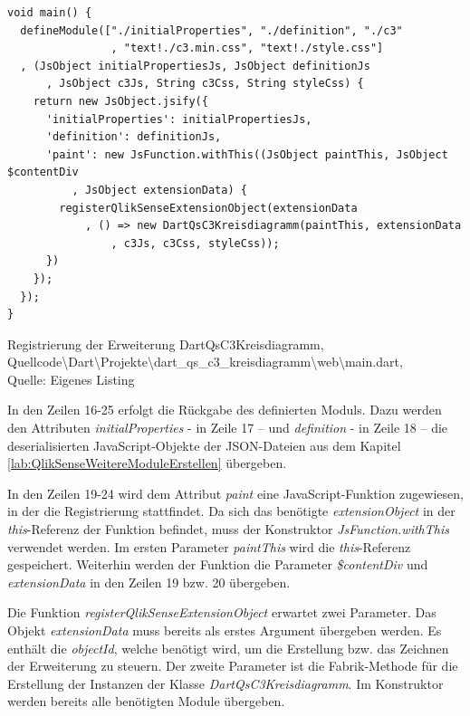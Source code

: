 \begin{listing}[htbp]
\begin{verbatim}
void main() {
  defineModule(["./initialProperties", "./definition", "./c3"
                , "text!./c3.min.css", "text!./style.css"]
  , (JsObject initialPropertiesJs, JsObject definitionJs
      , JsObject c3Js, String c3Css, String styleCss) {
    return new JsObject.jsify({
      'initialProperties': initialPropertiesJs,
      'definition': definitionJs,
      'paint': new JsFunction.withThis((JsObject paintThis, JsObject $contentDiv
          , JsObject extensionData) {
        registerQlikSenseExtensionObject(extensionData
            , () => new DartQsC3Kreisdiagramm(paintThis, extensionData
                , c3Js, c3Css, styleCss));
      })
    });
  });
}
\end{verbatim}
\caption[Registrierung der Erweiterung DartQsC3Kreisdiagramm]{Registrierung der Erweiterung DartQsC3Kreisdiagramm, \\Quellcode\textbackslash{}Dart\textbackslash{}Projekte\textbackslash{}dart\_qs\_c3\_kreisdiagramm\textbackslash{}web\textbackslash{}main.dart, \\Quelle: Eigenes Listing}
\label{lst:RegistrierungDerErweiterungDartQsC3Kreisdiagramm}
\end{listing}

In den Zeilen 16-25 erfolgt die Rückgabe des definierten Moduls. Dazu werden den Attributen \textit{initialProperties} - in Zeile 17 – und \textit{definition} - in Zeile 18 – die deserialisierten JavaScript-Objekte der JSON-Dateien aus dem Kapitel \ref{lab:QlikSenseWeitereModuleErstellen} übergeben.

In den Zeilen 19-24 wird dem Attribut \textit{paint} eine JavaScript-Funktion zugewiesen, in der die Registrierung stattfindet. Da sich das benötigte \textit{extensionObject} in der \textit{this}-Referenz der Funktion befindet, muss der Konstruktor \textit{JsFunction.withThis} verwendet werden. Im ersten Parameter \textit{paintThis} wird die \textit{this}-Referenz gespeichert. Weiterhin werden der Funktion die Parameter \textit{\$contentDiv} und \textit{extensionData} in den Zeilen 19 bzw. 20 übergeben.

Die Funktion \textit{registerQlikSenseExtensionObject} erwartet zwei Parameter. Das Objekt \textit{extension\-Data} muss bereits als erstes Argument übergeben werden. Es enthält die \textit{objectId}, welche benötigt wird, um die Erstellung bzw. das Zeichnen der Erweiterung zu steuern. Der zweite Parameter ist die Fabrik-Methode für die Erstellung der Instanzen der Klasse \textit{DartQsC3Kreisdiagramm}. Im Konstruktor werden bereits alle benötigten Module übergeben.







